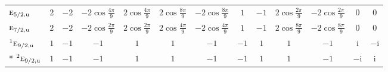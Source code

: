 \documentclass[10pt,a4paper]{article}
\numberwithin{equation}{section}
\newcommand{\irr}[1]{\text{\normalfont\scshape #1}}
\newcommand{\conjpair}[1]{{}^{#1}}
\newcommand{\ptag}[1]{\mathrm{#1}}
\newcommand{\iunit}{\mathrm{i}}
\begin{document}
{{\begin{longtable}{@{}lcccccccccccc@{}}
$\irr{e}_{5/2,\ptag{u}}$ & $2$ & $-2$ & $-2\cos\tfrac{4\pi}{9}$ & $2\cos\tfrac{4\pi}{9}$ & $2\cos\tfrac{8\pi}{9}$ & $-2\cos\tfrac{8\pi}{9}$ & $1$ & $-1$ & $2\cos\tfrac{2\pi}{9}$ & $-2\cos\tfrac{2\pi}{9}$ & $0$ & $0$\\
$\irr{e}_{7/2,\ptag{u}}$ & $2$ & $-2$ & $-2\cos\tfrac{2\pi}{9}$ & $2\cos\tfrac{2\pi}{9}$ & $2\cos\tfrac{4\pi}{9}$ & $-2\cos\tfrac{4\pi}{9}$ & $1$ & $-1$ & $2\cos\tfrac{8\pi}{9}$ & $-2\cos\tfrac{8\pi}{9}$ & $0$ & $0$\\
$\conjpair{1}\irr{e}_{9/2,\ptag{u}}$ & $1$ & $-1$ & $-1$ & $1$ & $1$ & $-1$ & $-1$ & $1$ & $1$ & $-1$ & $\iunit{}$ & $-\iunit{}$\\*
$\conjpair{2}\irr{e}_{9/2,\ptag{u}}$ & $1$ & $-1$ & $-1$ & $1$ & $1$ & $-1$ & $-1$ & $1$ & $1$ & $-1$ & $-\iunit{}$ & $\iunit{}$\\
\bottomrule\end{longtable}}}
\end{document}
